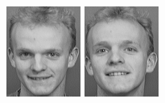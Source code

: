 \begin{figure}[ht]
 \includegraphics[width=\columnwidth/11]{ch3/figures/s5_9.png}
 \includegraphics[width=\columnwidth/11]{ch3/figures/s5_10.png}\\

\end{figure}
